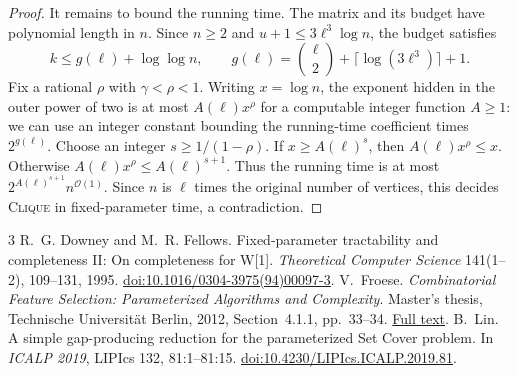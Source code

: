 \documentclass[11pt]{article}
\newcommand{\problem}[1]{\textsc{#1}}
\begin{document}
\begin{proof}
It remains to bound the running time. The matrix and its budget have
polynomial length in \(n\). Since \(n\ge 2\) and
\(u+1\le 3\ell^3\log n\), the budget satisfies
\[
 k\le g(\ell)+\log\log n,\qquad
 g(\ell)=\binom{\ell}{2}+\lceil\log(3\ell^3)\rceil+1.
\]
Fix a rational \(\rho\) with \(\gamma<\rho<1\). Writing \(x=\log n\),
the exponent hidden in the outer power of two is at most
\(A(\ell)x^\rho\) for a computable integer function \(A\ge 1\):
we can use an integer constant bounding the running-time coefficient
times \(2^{g(\ell)}\). Choose an integer \(s\ge 1/(1-\rho)\).
If \(x\ge A(\ell)^s\), then \(A(\ell)x^\rho\le x\).
Otherwise \(A(\ell)x^\rho\le A(\ell)^{s+1}\).
Thus the running time is at most
\(2^{A(\ell)^{s+1}}n^{\mathcal O(1)}\). Since \(n\) is \(\ell\) times
the original number of vertices, this decides \problem{Clique} in
fixed-parameter time, a contradiction.
\end{proof}

\begin{thebibliography}{3}
 R.~G. Downey and M.~R. Fellows.
Fixed-parameter tractability and completeness II: On completeness for W[1].
\emph{Theoretical Computer Science} 141(1--2), 109--131, 1995.
\href{https://doi.org/10.1016/0304-3975(94)00097-3}{doi:10.1016/0304-3975(94)00097-3}.
 V.~Froese. \emph{Combinatorial Feature Selection:
Parameterized Algorithms and Complexity}. Master's thesis, Technische
Universit\"at Berlin, 2012, Section~4.1.1, pp.~33--34.
\href{https://fpt.akt.tu-berlin.de/publications/theses/MA-vincent-froese.pdf}{Full text}.
 B.~Lin. A simple gap-producing reduction for the parameterized
Set Cover problem. In \emph{ICALP 2019}, LIPIcs 132, 81:1--81:15.
\href{https://doi.org/10.4230/LIPIcs.ICALP.2019.81}{doi:10.4230/LIPIcs.ICALP.2019.81}.
\end{thebibliography}
\end{document}
